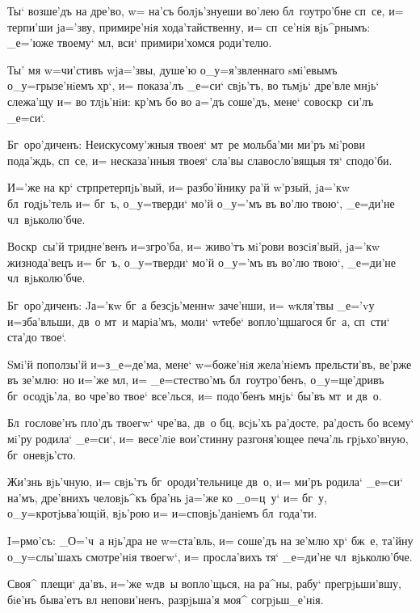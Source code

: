 Ты` возше'дъ на дре'во, w= на'съ болjь'знуеши во'лею 
бл~гоутро'бне сп~се, и= терпи'ши jа='зву, примире'нiя 
хода'тайственну, и= сп~се'нiя вjь^рнымъ: _е='юже твоему` 
мл, вси` примири'хомся роди'телю.

Ты' мя w=чи'стивъ w\т jа='звы, душе'ю о_у=я'звленнаго 
sмi'евымъ о_у=грызе'нiемъ хр`, и= показа'лъ _е=си` 
свjь'тъ, во тьмjь` дре'вле мнjь` слежа'щу и= во тлjь'нiи: 
кр'мъ бо во а='дъ соше'дъ, мене` совоскр~си'лъ 
_е=си`.

Бг~оро'диченъ: Неискусому'жныя твоея` мт~ре мольба'ми 
ми'ръ мi'рови пода'ждь, сп~се, и= несказа'нныя твоея` 
сла'вы славосло'вящыя тя` сподо'би.


И='же на кр` стр претерпjь'вый, и= 
разбо'йнику ра'й w'рзый, jа='кw бл~годjь'тель и= 
бг~ъ, о_у=тверди` мо'й о_у='мъ въ во'лю твою`, _е=ди'не 
чл~вjьколю'бче.

Воскр~сы'й тридне'венъ и=з\ъ гро'ба, и= живо'тъ 
мi'рови возсiя'вый, jа='кw жизнода'вецъ и= бг~ъ, 
о_у=тверди` мо'й о_у='мъ въ во'лю твою`, _е=ди'не 
чл~вjьколю'бче.

Бг~оро'диченъ: Jа='кw бг~а безсjь'меннw заче'нши, и= 
w\т кля'твы _е='vу и=зба'вльши, дв~о мт~и марiа'мъ, моли` 
w\т тебе` вопло'щшагося бг~а, сп~сти` ста'до твое`.


Sмi'й поползы'й и=з\ъ _е=де'ма, мене` w=боже'нiя 
жела'нiемъ прельсти'въ, ве'рже въ зе'млю: но и='же 
мл, и= _е=стество'мъ бл~гоутро'бенъ, о_у=ще'дривъ 
бг~осодjь'ла, во чре'во твое` все'лься, и= подо'бенъ 
мнjь` бы'въ мт~и дв~о.

Бл~гослове'нъ пло'дъ твоегw` чре'ва, дв~о бц, 
всjь'хъ ра'досте, ра'дость бо всему` мi'ру родила` 
_е=си`, и= весе'лiе вои'стинну разгоня'ющее печа'ль 
грjьхо'вную, бг~оневjь'сто.

Жи'знь вjь'чную, и= свjь'тъ бг~ороди'тельнице дв~о, и= 
ми'ръ родила` _е=си` на'мъ, дре'внихъ человjь^къ бра'нь 
jа='же ко _о=ц~у` и= бг~у, о_у=кротjьва'ющiй, вjь'рою и= 
и=сповjь'данiемъ бл~года'ти.


I=рмо'съ: _О='ч~а нjь'дра не w=ста'вль, и= соше'дъ на 
зе'млю хр` бж~е, та'йну о_у=слы'шахъ смотре'нiя 
твоегw`, и= просла'вихъ тя` _е=ди'не чл~вjьколю'бче.

Своя^ плещи` да'въ, и='же w\т дв~ы вопло'щься, на 
ра^ны, рабу` прегрjьши'вшу, бiе'нъ быва'етъ вл 
непови'ненъ, разрjьша'я моя^ согрjьш_е'нiя.


